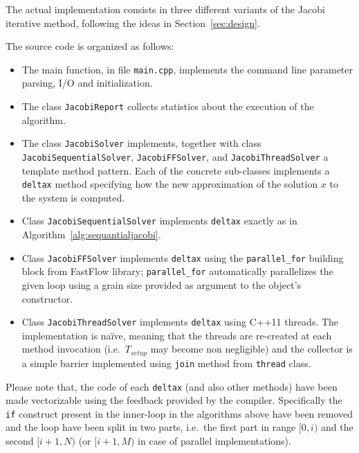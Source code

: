 The actual implementation consists in three different variants of the Jacobi iterative method, following the ideas in Section~\ref{sec:design}.

The source code is organized as follows:
\begin{itemize}
	\item The main function, in file \verb|main.cpp|, implements the command line parameter parsing, I/O and initialization.
	\item The class \verb|JacobiReport| collects statistics about the execution of the algorithm.
	\item The class \verb|JacobiSolver| implements, together with class \verb|JacobiSequentialSolver|, \verb|JacobiFFSolver|, and \verb|JacobiThreadSolver| a template method pattern.
	Each of the concrete sub-classes implements a \verb|deltax| method specifying how the new approximation of the solution $x$ to the system is computed.
	\item Class \verb|JacobiSequentialSolver| implements \verb|deltax| exactly as in Algorithm~\ref{alg:sequantialjacobi}.
	\item Class \verb|JacobiFFSolver| implements \verb|deltax| using the \verb|parallel_for| building block from FastFlow library; \verb|parallel_for| automatically parallelizes the given loop using a grain size provided as argument to the object's constructor.
	\item Class \verb|JacobiThreadSolver| implements \verb|deltax| using C++11 threads. The implementation is na\"ive, meaning that the threads are re-created at each method invocation (i.e.\ $T_{setup}$ may become non negligible)  and the collector is a simple barrier implemented using \verb|join| method from \verb|thread| class.
\end{itemize}

Please note that, the code of each \verb|deltax| (and also other methods) have been made vectorizable using the feedback provided by the compiler.
Specifically the \verb|if| construct present in the inner-loop in the algorithms above have been removed and the loop have been split in two parts, i.e.\ the first part in range $[0, i)$ and the second $[i+1, N)$ (or  $[i+1, M)$ in case of parallel implementations).